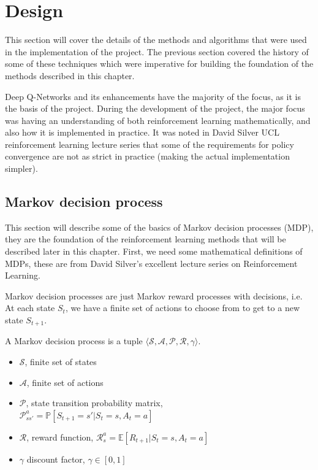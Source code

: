 \chapter{Design}
This section will cover the details of the methods and algorithms that were used in the implementation of the project. The previous section covered the history of some of these techniques which were imperative for building the foundation of the methods described in this chapter.

Deep Q-Networks and its enhancements have the majority of the focus, as it is the basis of the project. During the development of the project, the major focus was having an understanding of both reinforcement learning mathematically, and also how it is implemented in practice. It was noted in David Silver UCL reinforcement learning lecture series \cite{davidsilver-course} that some of the requirements for policy convergence are not as strict in practice (making the actual implementation simpler).

\section{Markov decision process}
\label{dsgn:sec:mdp}
This section will describe some of the basics of Markov decision processes (MDP), they are the foundation of the reinforcement learning methods that will be described later in this chapter. First, we need some mathematical definitions of MDPs, these are from David Silver's excellent lecture series on Reinforcement Learning.

Markov decision processes are just Markov reward processes with decisions, i.e. At each state $S_t$, we have a finite set of actions to choose from to get to a new state $S_{t+1}$.

\begin{defn}
	A Markov decision process is a tuple $\langle \mathcal{S}, \mathcal{A}, \mathcal{P}, \mathcal{R}, \gamma \rangle$.
	\begin{itemize}
		\item $\mathcal{S}$, finite set of states
		\item $\mathcal{A}$, finite set of actions
		\item $\mathcal{P}$, state transition probability matrix,~\\$\mathcal{P}_{ss'}^a = \mathbb{P}[S_{t+1}=s'|S_t=s, A_t=a]$
		\item $\mathcal{R}$, reward function, $\mathcal{R}_s^a = \mathbb{E}[R_{t+1}|S_t=s,A_t=a]$
		\item $\gamma$ discount factor, $\gamma\in[0,1]$
	\end{itemize}
\end{defn}

